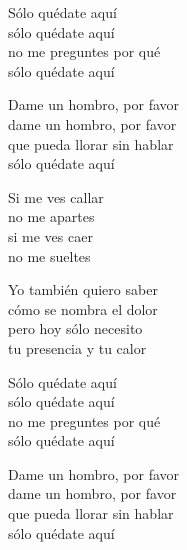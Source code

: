 \begin{lyrics}
Sólo quédate aquí\\
sólo quédate aquí\\
no me preguntes por qué\\
sólo quédate aquí

Dame un hombro, por favor\\
dame un hombro, por favor\\
que pueda llorar sin hablar\\
sólo quédate aquí

Si me ves callar\\
no me apartes\\
si me ves caer\\
no me sueltes

Yo también quiero saber\\
cómo se nombra el dolor\\
pero hoy sólo necesito\\
tu presencia y tu calor

Sólo quédate aquí\\
sólo quédate aquí\\
no me preguntes por qué\\
sólo quédate aquí

Dame un hombro, por favor\\
dame un hombro, por favor\\
que pueda llorar sin hablar\\
sólo quédate aquí
\end{lyrics}

